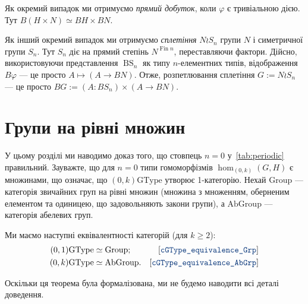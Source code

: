 \documentclass[12pt]{article}
\renewcommand*{\equiv}{\mathrel{\simeq}}
\newcommand*\BS{\mathop{BS}}
\newcommand*\Sym{S}
\DeclareMathOperator\Fin{Fin}
\newcommand*{\GType}{\mathrm{GType}}
\newcommand*{\Group}{\mathrm{Group}}
\newcommand*{\AbGroup}{\mathrm{AbGroup}}
\newcommand*{\leanref}[1]{{\normalfont[\texttt{\color{DarkBlue}#1}]}}
\begin{document}
Як окремий випадок ми отримуємо \emph{прямий добуток}, коли $\varphi$ є тривіальною дією. Тут $B(H \times N) \equiv BH \times BN$.

Як інший окремий випадок ми отримуємо \emph{сплетіння} $N \wr \Sym_n$ групи $N$ і симетричної групи $\Sym_n$. Тут $\Sym_n$ діє на прямий степінь $N^{\Fin n}$, переставляючи фактори. Дійсно, використовуючи представлення $\BS_n$ як типу $n$-елементних типів, відображення $B\varphi$ — це просто $A \mapsto (A \to BN)$. Отже, розпетлювання сплетіння $G := N \wr \Sym_n$ — це просто $BG := (A : BS_n) \times (A \to BN)$.

\section{Групи на рівні множин}
\label{sec:n=0}
У цьому розділі ми наводимо доказ того, що стовпець $n=0$ у~\autoref{tab:periodic} правильний. Зауважте, що для $n=0$ типи гомоморфізмів $\hom_{(0,k)}(G,H)$ є множинами, що означає, що $(0,k)\GType$ утворює 1-категорію. Нехай $\Group$ — категорія звичайних груп на рівні множин (множина з множенням, оберненим елементом та одиницею, що задовольняють закони групи), а $\AbGroup$ — категорія абелевих груп.

\begin{theorem}
  Ми маємо наступні еквівалентності категорій {\normalfont(}для $k \ge 2${\normalfont):}
  \begin{align*}
    (0,1)\GType &\equiv \Group;&\text{\leanref{cGType\_equivalence\_Grp}}&\\
    (0,k)\GType &\equiv \AbGroup.&\text{\leanref{cGType\_equivalence\_AbGrp}}&
  \end{align*}
\end{theorem}

Оскільки ця теорема була формалізована, ми не будемо наводити всі деталі доведення.
\end{document}
